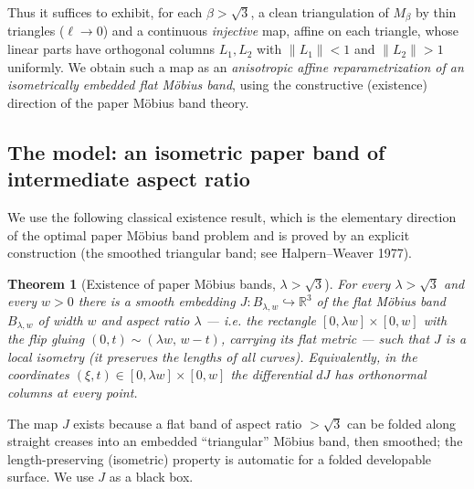 \documentclass[11pt]{article}
\newtheorem{theorem}{Theorem}
\theoremstyle{definition}
\newcommand{\R}{\mathbb{R}}
\newcommand{\norm}[1]{\lVert #1 \rVert}
\begin{document}
Thus it suffices to exhibit, for each $\beta>\sqrt3$, a clean triangulation of $M_\beta$ by
thin triangles ($\ell\to 0$) and a continuous \emph{injective} map, affine on each
triangle, whose linear parts have orthogonal columns $L_1,L_2$ with $\norm{L_1}<1$ and
$\norm{L_2}>1$ uniformly. We obtain such a map as an \emph{anisotropic affine reparametrization
of an isometrically embedded flat M\"obius band}, using the constructive (existence)
direction of the paper M\"obius band theory.

\subsection{The model: an isometric paper band of intermediate aspect ratio}\label{sec:model}

We use the following classical existence result, which is the elementary direction of the
optimal paper M\"obius band problem and is proved by an explicit construction (the smoothed
triangular band; see Halpern--Weaver 1977).

\begin{theorem}[Existence of paper M\"obius bands, $\lambda>\sqrt3$]\label{thm:exist}
For every $\lambda>\sqrt3$ and every $w>0$ there is a smooth embedding
$J:B_{\lambda,w}\hookrightarrow\R^3$ of the flat M\"obius band $B_{\lambda,w}$ of width $w$
and aspect ratio $\lambda$ --- i.e. the rectangle $[0,\lambda w]\times[0,w]$ with the flip
gluing $(0,t)\sim(\lambda w,\,w-t)$, carrying its flat metric --- such that $J$ is a
\emph{local isometry} (it preserves the lengths of all curves). Equivalently, in the
coordinates $(\xi,t)\in[0,\lambda w]\times[0,w]$ the differential $dJ$ has orthonormal
columns at every point.
\end{theorem}

\noindent The map $J$ exists because a flat band of aspect ratio $>\sqrt3$ can be folded
along straight creases into an embedded ``triangular'' M\"obius band, then smoothed; the
length-preserving (isometric) property is automatic for a folded developable surface. We use
$J$ as a black box.
\end{document}
